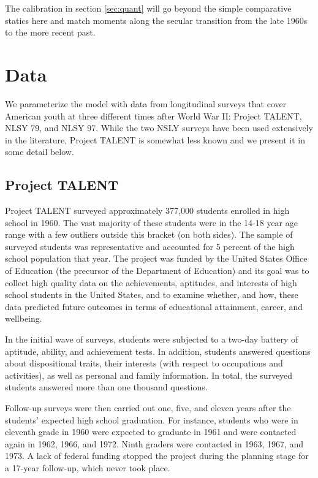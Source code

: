 \documentclass[onehalfspacing,11pt]{article}
\begin{document}
The calibration in section \ref{sec:quant} will go beyond the simple comparative statics here and match moments along the secular transition from the late 1960s to the more recent past.

\section{Data}\label{sec:data}

We parameterize the model with data from longitudinal surveys that cover American youth at three different times after World War II: Project TALENT, NLSY 79, and NLSY 97. While the two NSLY surveys have been used extensively in the literature, Project TALENT is somewhat less known and we present it in some detail below.
\subsection{Project TALENT}

Project TALENT surveyed approximately 377,000 students enrolled in high school in 1960. The vast majority of these students were in the 14-18 year age range with a few outliers outside this bracket (on both sides). The sample of surveyed students was representative and accounted for 5 percent of the high school population that year. The project was funded by the United States Office of Education (the precursor of the Department of Education) and its goal was to collect high quality data on the achievements, aptitudes, and interests of high school students in the United States, and to examine whether, and how, these data predicted future outcomes in terms of educational attainment, career, and wellbeing.

In the initial wave of surveys, students were subjected to a two-day battery of aptitude, ability, and achievement tests. In addition, students answered questions about dispositional traits, their interests (with respect to occupations and activities), as well as personal and family information. 	In total, the surveyed students answered more than one thousand questions.

Follow-up surveys were then carried out one, five, and eleven years after the students' expected high school graduation. For instance, students who were in eleventh grade in 1960 were expected to graduate in 1961 and were contacted again in 1962, 1966, and 1972. Ninth graders were contacted in 1963, 1967, and 1973. A lack of federal funding stopped the project during the planning stage for a 17-year follow-up, which never took place.
\end{document}
